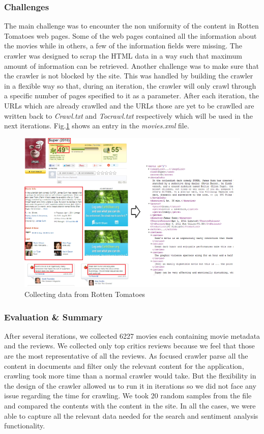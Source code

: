\subsubsection{Challenges}
The main challenge was to encounter the non uniformity of the content in Rotten Tomatoes web pages. Some of the web pages contained all the information about the movies while in others, a few of the information fields were missing. The crawler was designed to scrap the HTML data in a way such that maximum amount of information can be retrieved. Another challenge was to make sure that the crawler is not blocked by the site. This was handled by building the crawler in a flexible way so that, during an iteration, the crawler will only crawl through a specific number of pages specified to it as a parameter. After each iteration, the URLs which are already crawlled and the URLs those are yet to be crawlled are written back to \textit{Crawl.txt} and \textit{Tocrawl.txt} respectively which will be used in the next iterations. Fig.\ref{fig:xmlFile} shows an entry in the \textit{movies.xml} file.

\begin{figure}[H]
    \centering
    \includegraphics[width=4.5in]{rot.png}
    \caption{Collecting data from Rotten Tomatoes}
    \label{fig:xmlFile}
\end{figure}

\subsubsection{Evaluation \& Summary}
After several iterations, we collected 6227 movies each containing movie metadata and the reviews. We collected only top critics reviews because we feel that those are the most representative of all the reviews. As focused crawler parse all the content in documents and filter only the relevant content for the application, crawling took more time than a normal crawler would take. But the flexibility in the design of the crawler allowed us to run it in iterations so we did not face any issue regarding the time for crawling. We took 20 random samples from the file and compared the contents with the content in the site. In all the cases, we were able to capture all the relevant data needed for the search and sentiment analysis functionality.

